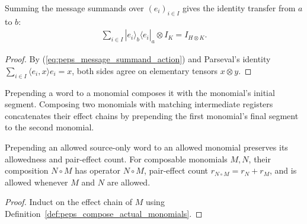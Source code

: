 \begin{lemma}
    \label{thm:peps_exact_message_identity}
    \leanok
    Summing the message summands over $(e_i)_{i\in I}$ gives the identity
    transfer from $a$ to $b$:
    \begin{align}
        \sum_{i\in I} |e_i\rangle_b\langle e_i|_a\otimes I_K
        =I_{H\otimes K}.
        \label{eq:peps_exact_message_identity}
    \end{align}
\end{lemma}
\begin{proof}
    \leanok
    By (\ref{eq:peps_message_summand_action}) and Parseval's identity
    $\sum_{i\in I}\langle e_i,x\rangle e_i=x$, both sides agree on elementary
    tensors $x\otimes y$.
\end{proof}

\begin{definition}
    \label{def:peps_compose_actual_monomials}
    \leanok
    Prepending a word to a monomial composes it with the monomial's initial
    segment. Composing two monomials with matching intermediate registers
    concatenates their effect chains by prepending the first monomial's final
    segment to the second monomial.
\end{definition}

\begin{lemma}
    \label{thm:peps_compose_actual_monomials}
    \leanok
    Prepending an allowed source-only word to an allowed monomial preserves its
    allowedness and pair-effect count. For composable monomials $M,N$, their
    composition $N\circ M$ has operator $N\circ M$, pair-effect count
    $r_{N\circ M}=r_N+r_M$, and is allowed whenever $M$ and $N$ are allowed.
\end{lemma}
\begin{proof}
    \leanok
    Induct on the effect chain of $M$ using
    Definition~\ref{def:peps_compose_actual_monomials}.
\end{proof}

